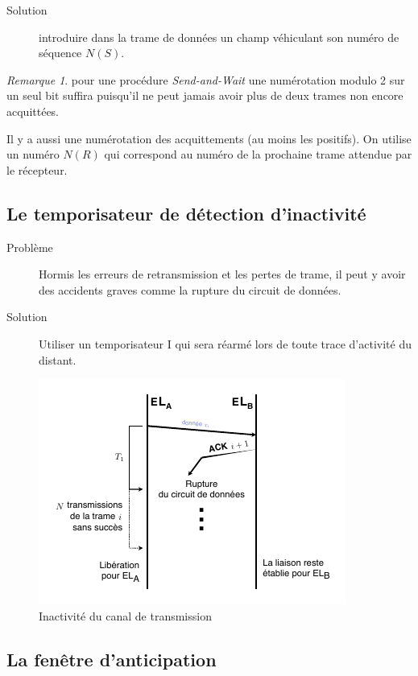 \documentclass[11pt,english,french]{scrreprt}
\theoremstyle{remark}
\newtheorem*{rem*}{Remarque}
\theoremstyle{definition}
\begin{document}
\begin{description}
	\item[Solution] introduire dans la trame de données un champ véhiculant son numéro de séquence $N(S)$.
\end{description}

\begin{rem*}
	pour une procédure \emph{Send-and-Wait} une numérotation modulo 2 sur un seul bit suffira puisqu'il ne peut jamais avoir plus de deux trames non encore acquittées.
	
	Il y a aussi une numérotation des acquittements (au moins les 	positifs). On utilise un numéro $N(R)$ qui correspond au numéro de la prochaine trame attendue par le récepteur.
\end{rem*}

\subsection*{Le temporisateur de détection d'inactivité} %

\begin{description}
	\item[Problème] Hormis les erreurs de retransmission et les pertes de trame, il peut y avoir des accidents graves comme la rupture du circuit de données.
	\item[Solution] Utiliser un temporisateur I qui sera réarmé lors de toute trace d'activité du distant.
\end{description}

\begin{figure}[h!]
	\center
	\includegraphics[scale=1.2]{graphes/inactivite}
	\caption{Inactivité du canal de transmission}
\end{figure}

\subsection*{La fenêtre d'anticipation} %
\end{document}
